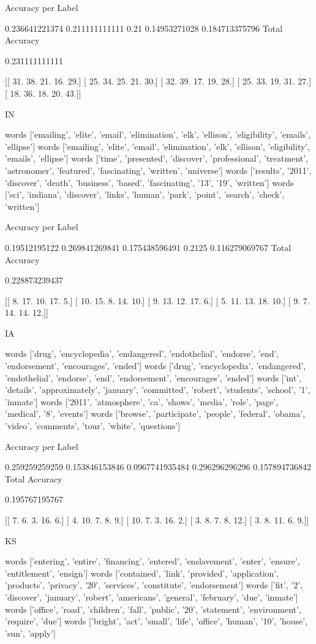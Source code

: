 \documentclass[11pt]{article}
\begin{document}
\begin{verbatium}
Accuracy per Label

0.236641221374
0.211111111111
0.21
0.14953271028
0.184713375796
Total Accuracy

0.231111111111


[[ 31.  38.  21.  16.  29.]
 [ 25.  34.  25.  21.  30.]
 [ 32.  39.  17.  19.  28.]
 [ 25.  33.  19.  31.  27.]
 [ 18.  36.  18.  20.  43.]]


IN


words
['emailing', 'elite', 'email', 'elimination', 'elk', 'ellison', 'eligibility', 'emails', 'ellipse']
words
['emailing', 'elite', 'email', 'elimination', 'elk', 'ellison', 'eligibility', 'emails', 'ellipse']
words
['time', 'presented', 'discover', 'professional', 'treatment', 'astronomer', 'featured', 'fascinating', 'written', 'universe']
words
['results', '2011', 'discover', 'death', 'business', 'based', 'fascinating', '13', '19', 'written']
words
['sci', 'indiana', 'discover', 'links', 'human', 'park', 'point', 'search', 'check', 'written']

Accuracy per Label

0.19512195122
0.269841269841
0.175438596491
0.2125
0.116279069767
Total Accuracy

0.228873239437


[[  8.  17.  10.  17.   5.]
 [ 10.  15.   8.  14.  10.]
 [  9.  13.  12.  17.   6.]
 [  5.  11.  13.  18.  10.]
 [  9.   7.  14.  14.  12.]]


IA


words
['drug', 'encyclopedia', 'endangered', 'endothelial', 'endorse', 'end', 'endorsement', 'encourages', 'ended']
words
['drug', 'encyclopedia', 'endangered', 'endothelial', 'endorse', 'end', 'endorsement', 'encourages', 'ended']
words
['int', 'details', 'approximately', 'january', 'committed', 'robert', 'students', 'school', '1', 'inmate']
words
['2011', 'atmosphere', 'ca', 'shows', 'media', 'role', 'page', 'medical', '8', 'events']
words
['browse', 'participate', 'people', 'federal', 'obama', 'video', 'comments', 'tour', 'white', 'questions']

Accuracy per Label

0.259259259259
0.153846153846
0.0967741935484
0.296296296296
0.157894736842
Total Accuracy

0.195767195767


[[  7.   6.   3.  16.   6.]
 [  4.  10.   7.   8.   9.]
 [ 10.   7.   3.  16.   2.]
 [  3.   8.   7.   8.  12.]
 [  3.   8.  11.   6.   9.]]


KS


words
['entering', 'entire', 'financing', 'entered', 'enslavement', 'enter', 'ensure', 'entitlement', 'ensign']
words
['contained', 'link', 'provided', 'application', 'products', 'privacy', '20', 'services', 'constitute', 'endorsement']
words
['fit', '2', 'discover', 'january', 'robert', 'americans', 'general', 'february', 'due', 'inmate']
words
['office', 'road', 'children', 'fall', 'public', '20', 'statement', 'environment', 'require', 'due']
words
['bright', 'act', 'small', 'life', 'office', 'human', '10', 'house', 'sun', 'apply']


\end{verbatium}
\end{document}
